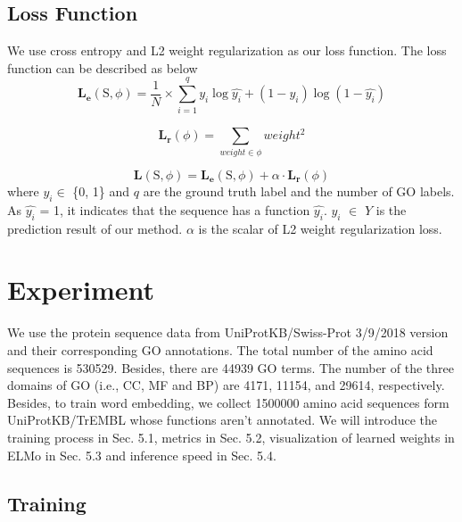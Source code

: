 \documentclass{article}
\begin{document}
\subsection{Loss Function}
We use cross entropy and L2 weight regularization as our loss function. The loss function can be described as below
\begin{equation}
\mathbf{L_{e}}(\mbox{S}, \phi) = \frac{1}{N} \times \sum_{i=1}^{q}y_i \log \hat{y_{i}} + (1-y_{i})\log(1-\hat{y_{i}})
\end{equation}

\begin{equation}
\mathbf{L_{r}}(\phi) = \sum_{weight \in \phi}^{} weight^{2}
\end{equation}

\begin{equation}
\mathbf{L}(\mbox{S}, \phi) = \mathbf{L_{e}}(\mbox{S}, \phi) + \alpha \cdot \mathbf{L_{r}}(\phi)
\end{equation}
where $\hat{y_{i}} \in$ \{0, 1\} and $q$ are the ground truth label and the number of GO labels. As $\hat{y_{i}}$ = 1, it indicates that the sequence has a function $\hat{y_{i}}$. $y_{i}$ $\in$ $Y$ is the prediction result of our method. $\alpha$ is the scalar of L2 weight regularization loss.


\section{Experiment}
    We use the protein sequence data from UniProtKB/Swiss-Prot 3/9/2018 version and their corresponding GO annotations. The total number of the amino acid sequences is 530529. Besides, there are 44939 GO terms. The number of the three domains of GO (i.e., CC, MF and BP) are 4171, 11154, and 29614, respectively. Besides, to train word embedding, we collect 1500000 amino acid sequences form UniProtKB/TrEMBL whose functions aren't annotated. We will introduce the training process in Sec. 5.1, metrics in Sec. 5.2, visualization of learned weights in ELMo in Sec. 5.3 and inference speed in Sec. 5.4.

    \subsection{Training}
\end{document}
